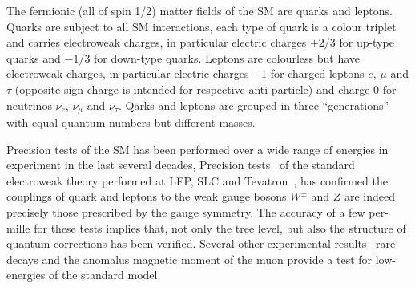 The fermionic (all of spin 1/2) matter fields of the SM are quarks and leptons. 
Quarks  are subject to all SM interactions, each type of quark is a colour triplet and carries 
electroweak charges, in particular electric charges $+2/3$ for up-type quarks and $-1/3$
for down-type quarks.  Leptons are colourless
but have electroweak charges, in particular electric charges $-1$ for charged leptons $e$, $\mu$ and $\tau$ (opposite sign charge 
is intended for respective anti-particle)  and charge 0 for neutrinos $\nu_e$, $\nu_{\mu}$ and $\nu_{\tau}$.
Qarks and leptons are grouped in three  ``generations'' with equal quantum numbers but different masses.


Precision tests of the SM has been performed over a wide range of energies in experiment in the last several decades,
Precision tests~\cite{precisiontest} of the standard electroweak theory performed at LEP, SLC and Tevatron~\cite{smtest}, 
has confirmed the couplings of quark and leptons to the weak gauge bosons $W^{\pm}$  and $Z$ are indeed
precisely those prescribed by the gauge symmetry. The accuracy of a few per-mille for these
tests implies that, not only the tree level, but also the structure of quantum corrections has
been verified. Several other experimental results~\cite{pdg} rare decays and the anomalus magnetic moment of the muon
provide a test for low-energies of the standard model.

%
%

 
